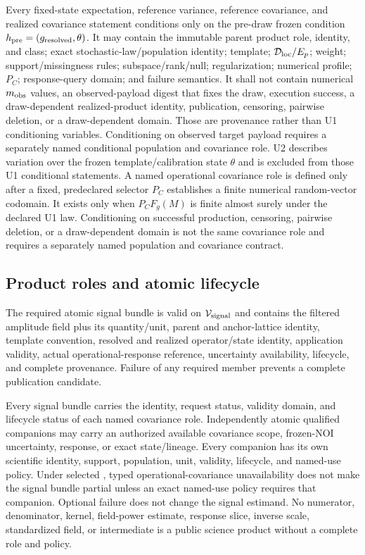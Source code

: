 Every fixed-state expectation, reference variance, reference covariance, and
realized covariance statement conditions only on the pre-draw frozen condition
$h_{\rm pre}=(g_{\rm resolved},\theta)$. It may contain the immutable parent
product role, identity, and class; exact stochastic-law/population identity;
template; $\mathcal{D}_{\rm loc}/E_p$; weight; support/missingness rules;
subspace/rank/null; regularization; numerical profile; $P_C$; response-query
domain; and failure semantics. It shall not contain numerical
$m_{\rm obs}$ values, an observed-payload digest that fixes the draw, execution
success, a draw-dependent realized-product identity, publication, censoring,
pairwise deletion, or a draw-dependent domain. Those are provenance rather
than U1 conditioning variables. Conditioning on observed target payload
requires a separately named conditional population and covariance role. U2 describes
variation over the frozen template/calibration
state $\theta$ and is excluded from those U1 conditional statements. A named
operational covariance role is defined only after a fixed, predeclared
selector $P_C$ establishes a finite numerical random-vector codomain. It exists
only when $P_CF_g(M)$ is finite almost surely under the declared U1 law.
Conditioning on successful production, censoring, pairwise deletion, or a
draw-dependent domain is not the same covariance role and requires a
separately named population and covariance contract.

\subsection{Product roles and atomic lifecycle}
\label{sec:product-roles}

The required atomic signal bundle is valid on $\mathcal{V}_{\rm signal}$ and
contains the filtered amplitude field plus
its quantity/unit, parent and anchor-lattice identity, template convention,
resolved and realized operator/state identity, application validity, actual
operational-response reference, uncertainty availability, lifecycle, and complete
provenance. Failure of any required member prevents a complete publication
candidate.

Every signal bundle carries the identity, request status, validity domain, and
lifecycle status of each named covariance role. Independently atomic qualified companions may carry an
authorized available covariance scope, frozen-NOI uncertainty, response, or
exact state/lineage. Every companion has its own scientific identity, support,
population, unit, validity, lifecycle, and named-use policy. Under selected
, typed operational-covariance unavailability does not make the signal bundle
partial unless an exact named-use policy requires that companion. Optional
failure does not change the signal estimand.
No numerator, denominator, kernel, field-power estimate, response slice,
inverse scale, standardized field, or intermediate is a public science product
without a complete role and policy.


